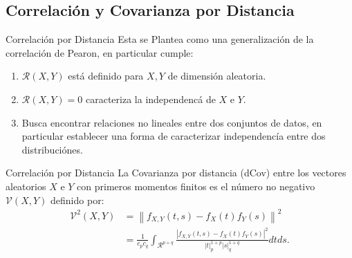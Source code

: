 \documentclass{beamer}
\begin{document}
\subsection{Correlaci\'on y Covarianza por Distancia}

\begin{frame}{Correlaci\'on por Distancia}
    Esta se Plantea como una generalizaci\'on de la correlaci\'on de Pearon, en particular cumple:
    \begin{enumerate}
        \item $\mathcal{R}(X,Y)$ est\'a definido para $X,Y$ de dimensi\'on aleatoria.
        \item $\mathcal{R}(X,Y) = 0$ caracteriza la independenc\'a de $X$ e $Y$.
        \item Busca encontrar relaciones no lineales entre dos conjuntos de datos, en particular establecer una forma de caracterizar independencía
        entre dos distribuciónes.
    \end{enumerate}
    \begin{block}{Correlaci\'on por Distancia}
        La Covarianza por distancia (dCov) entre los vectores aleatorios $X$ e $Y$ con primeros momentos finitos es el n\'umero no negativo $\mathcal{V}(X, Y)$ definido por:
        \begin{equation}
            \begin{aligned}\label{dcov_formula}
                \mathcal{V}^2(X, Y) & =\left\|f_{X, Y}(t, s)-f_X(t) f_Y(s)\right\|^2 \\
                & =\frac{1}{c_p c_q} \int_{\mathcal{R}^{p+q}} \frac{\left|f_{X, Y}(t, s)-f_X(t) f_Y(s)\right|^2}{|t|_p^{1+p}|s|_q^{1+q}} d t d s .
                \end{aligned}
        \end{equation}
    \end{block}
\end{frame}
\end{document}
